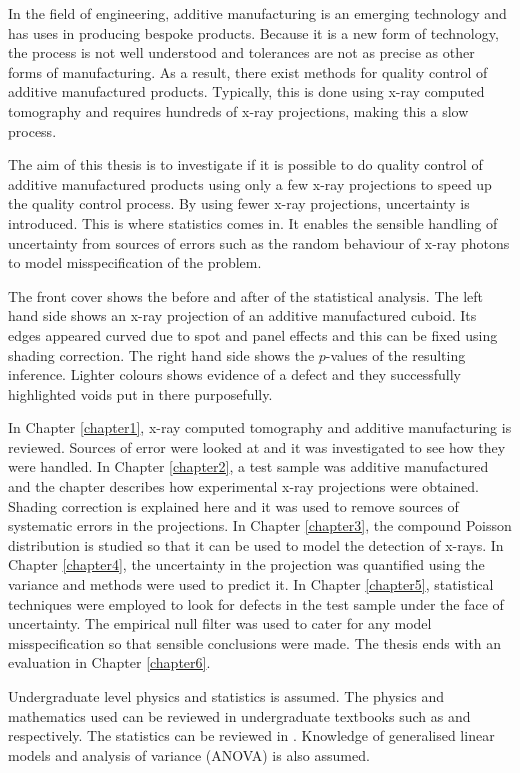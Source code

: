 \documentclass[12pt, a4paper]{memoir}
\begin{document}
In the field of engineering, additive manufacturing is an emerging technology and has uses in producing bespoke products. Because it is a new form of technology, the process is not well understood and tolerances are not as precise as other forms of manufacturing. As a result, there exist methods for quality control of additive manufactured products. Typically, this is done using x-ray computed tomography and requires hundreds of x-ray projections, making this a slow process.

The aim of this thesis is to investigate if it is possible to do quality control of additive manufactured products using only a few x-ray projections to speed up the quality control process. By using fewer x-ray projections, uncertainty is introduced. This is where statistics comes in. It enables the sensible handling of uncertainty from sources of errors such as the random behaviour of x-ray photons to model misspecification of the problem.

The front cover shows the before and after of the statistical analysis. The left hand side shows an x-ray projection of an additive manufactured cuboid. Its edges appeared curved due to spot and panel effects and this can be fixed using shading correction. The right hand side shows the $p$-values of the resulting inference. Lighter colours shows evidence of a defect and they successfully highlighted voids put in there purposefully.

In Chapter \ref{chapter1}, x-ray computed tomography and additive manufacturing is reviewed. Sources of error were looked at and it was investigated to see how they were handled. In Chapter \ref{chapter2}, a test sample was additive manufactured and the chapter describes how experimental x-ray projections were obtained. Shading correction is explained here and it was used to remove sources of systematic errors in the projections. In Chapter \ref{chapter3}, the compound Poisson distribution is studied so that it can be used to model the detection of x-rays. In Chapter \ref{chapter4}, the uncertainty in the projection was quantified using the variance and methods were used to predict it. In Chapter \ref{chapter5}, statistical techniques were employed to look for defects in the test sample under the face of uncertainty. The empirical null filter was used to cater for any model misspecification so that sensible conclusions were made. The thesis ends with an evaluation in Chapter \ref{chapter6}.

Undergraduate level physics and statistics is assumed. The physics and mathematics used can be reviewed in undergraduate textbooks such as \cite{serway2018physics} and \cite{riley2006mathematical} respectively. The statistics can be reviewed in \cite{rice2009mathematical}. Knowledge of generalised linear models \citep{nelder1972generalized,nelder1972generalized_2, mccullagh1984generalized} and analysis of variance (ANOVA) is also assumed.
\end{document}
